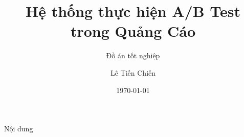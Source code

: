 \documentclass{beamer}
\title{Hệ thống thực hiện A/B Test trong Quảng Cáo}
\subtitle{Đồ án tốt nghiệp}
\author{Lê Tiến Chiến}
\institute{Ngành: Khoa học máy tính}
\date{\today}
\begin{document}
\titlepage

\begin{frame}{Nội dung}
	\tableofcontents[hideallsubsections]
\end{frame}






\end{document}
